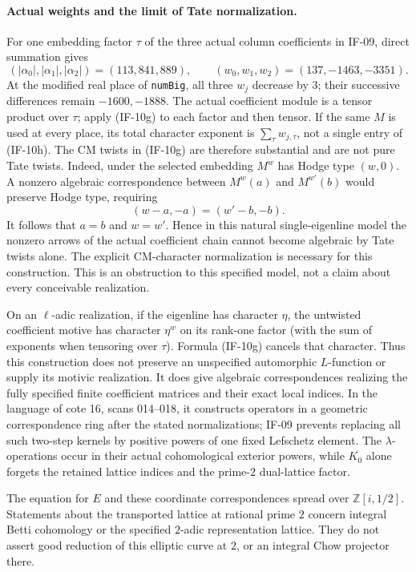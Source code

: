\paragraph{Actual weights and the limit of Tate normalization.}
For one embedding factor $\tau$ of the three actual column coefficients
in IF-09, direct summation gives
\[
 (|\alpha_0|,|\alpha_1|,|\alpha_2|)=(113,841,889),
 \qquad (w_0,w_1,w_2)=(137,-1463,-3351).           \tag{IF-10h}
\]
At the modified real place of \texttt{numBig}, all three $w_j$ decrease
by $3$; their successive differences remain $-1600,-1888$.
The actual coefficient module is a tensor product over $\tau$; apply
(IF-10g) to each factor and then tensor. If the same $M$ is used at
every place, its total character exponent is $\sum_\tau w_{j,\tau}$,
not a single entry of (IF-10h). The CM twists in (IF-10g) are therefore
substantial and are not pure
Tate twists. Indeed, under the selected embedding $M^w$ has Hodge type
$(w,0)$. A nonzero algebraic correspondence between
$M^w(a)$ and $M^{w'}(b)$ would preserve Hodge type, requiring
\[
 (w-a,-a)=(w'-b,-b).
\]
It follows that $a=b$ and $w=w'$. Hence in this natural single-eigenline
model the nonzero arrows of the actual coefficient chain cannot become
algebraic by Tate twists alone. The explicit CM-character normalization
is necessary for this construction. This is an obstruction to this
specified model, not a claim about every conceivable realization.

On an $\ell$-adic realization, if the eigenline has character $\eta$,
the untwisted coefficient motive has character $\eta^w$ on its rank-one
factor (with the sum of exponents when tensoring over $\tau$). Formula
(IF-10g) cancels that character. Thus this construction
does not preserve an unspecified automorphic $L$-function or supply its
motivic realization. It does give algebraic correspondences realizing
the fully specified finite coefficient matrices and their exact local
indices. In the language of cote 16, scans 014--018, it constructs
operators in a geometric correspondence ring after the stated
normalizations; IF-09 prevents replacing all such two-step kernels by
positive powers of one fixed Lefschetz element. The $\lambda$-operations
occur in their actual cohomological exterior powers, while $K_0$ alone
forgets the retained lattice indices and the prime-$2$ dual-lattice
factor.

The equation for $E$ and these coordinate correspondences spread over
$\mathbb Z[i,1/2]$. Statements about the transported lattice at rational
prime $2$ concern integral Betti cohomology or the specified $2$-adic
representation lattice. They do not assert good reduction of this
elliptic curve at $2$, or an integral Chow projector there.
